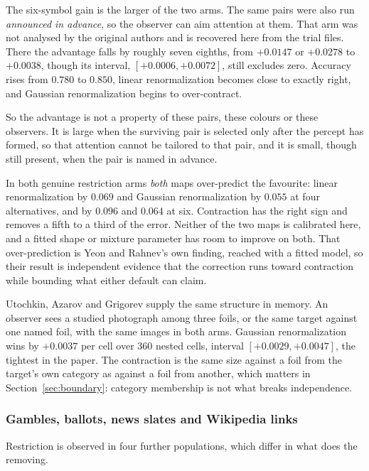 \documentclass[11pt]{article}
\begin{document}
The six-symbol gain is the larger of the two arms. The same pairs were also run \emph{announced in advance}, so the
observer can aim attention at them. That arm was not analysed by the original authors and is
recovered here from the trial files. There the advantage falls by roughly seven eighths, from
$+0.0147$ or $+0.0278$ to $+0.0038$, though its interval, $[+0.0006, +0.0072]$, still excludes
zero. Accuracy rises from $0.780$ to $0.850$, linear renormalization becomes close to exactly
right, and Gaussian renormalization begins to over-contract.

So the advantage is not a property of these pairs, these colours or these observers. It is large
when the surviving pair is selected only after the percept has formed, so that attention cannot
be tailored to that pair, and it is small, though still present, when the pair is named in
advance.

In both genuine restriction arms \emph{both} maps over-predict the favourite: linear renormalization by $0.069$ and Gaussian renormalization by
$0.055$ at four alternatives, and by $0.096$ and $0.064$ at six. Contraction has the right
sign and removes a fifth to a third of the error. Neither of the two maps is calibrated
here, and a fitted shape or mixture parameter has room to improve on both. That over-prediction is Yeon and
Rahnev's own finding, reached with a fitted model, so their result is independent evidence
that the correction runs toward contraction while bounding what either default can claim.

Utochkin, Azarov and Grigorev \cite{utochkin2025} supply the same structure in memory. An
observer sees a studied photograph among three foils, or the same target against one named
foil, with the same images in both arms. Gaussian renormalization wins by $+0.0037$ per cell over $360$
nested cells, interval $[+0.0029, +0.0047]$, the tightest in the paper. The contraction is
the same size against a foil from the target's own category as against a foil from another,
which matters in Section~\ref{sec:boundary}: category membership is not what breaks
independence.

\subsubsection{Gambles, ballots, news slates and Wikipedia links}
\label{sec:more}

Restriction is observed in four further populations, which differ in what does the removing.
\end{document}
